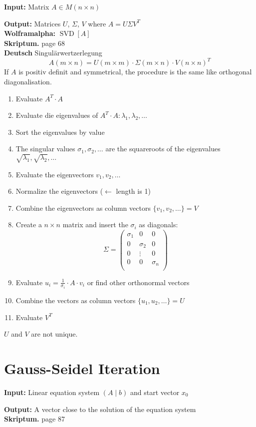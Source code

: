 \documentclass[a4paper,twocolumn]{article}
\newcommand{\io}[2]{{\par\noindent\textbf{Input:} #1 \\}{\textbf{Output:} #2 \\}}
\newcommand{\wa}[1]{\textbf{Wolframalpha:} $#1$ \\}
\newcommand{\scriptref}[1]{\textbf{Skriptum.} page #1 \\}
\newcommand{\dt}[1]{\textbf{Deutsch } #1 \\}
\begin{document}
\io{Matrix $A \in M(n\times n)$}{Matrices $U$, $\Sigma$, $V$
    where $A = U\Sigma V^T$}
\wa{\operatorname{SVD}[A]}
\scriptref{68}
\dt{Singulärwertzerlegung}
%
\[
    A(m\times n) = U(m\times m) \cdot \Sigma(m\times n)
        \cdot V(n\times n)^T
\]
If $A$ is positiv definit and symmetrical, the procedure is the same like
orthogonal diagonalisation.
%
\begin{enumerate}
    \item Evaluate $A^T\cdot A$
    \item Evaluate die eigenvalues of
          $A^T\cdot A: \lambda_1, \lambda_2, \ldots$
    \item Sort the eigenvalues by value
    \item The singular values $\sigma_1, \sigma_2, \ldots$
          are the squareroots of the eigenvalues $\sqrt{\lambda_1},
          \sqrt{\lambda_2}, \ldots$
    \item Evaluate the eigenvectors $v_1, v_2, \ldots$
    \item Normalize the eigenvectors ($\leftarrow$ length is 1)
    \item Combine the eigenvectors as column vectors $\{v_1, v_2, \ldots\} = V$
    \item Create a $n\times n$ matrix and insert the $\sigma_i$ as
          diagonals:
          \[
            \Sigma = 
            \begin{pmatrix}
                \sigma_1 & 0 & 0 \\
                0 & \sigma_2 & 0 \\
                0 & \vdots   & 0 \\
                0 & 0 & \sigma_n \\
            \end{pmatrix}
          \]
    \item Evaluate $u_i = \frac{1}{\sigma_i} \cdot A \cdot v_i$ or find
          other orthonormal vectors
    \item Combine the vectors as column vectors $\{u_1, u_2, \ldots\} = U$
    \item Evaluate $V^T$
\end{enumerate}
%
$U$ and $V$ are not unique.

\section{Gauss-Seidel Iteration}

\io{Linear equation system $(A\mid b)$ and start vector $x_0$}
   {A vector close to the solution of the equation system}
\scriptref{87}
\end{document}
